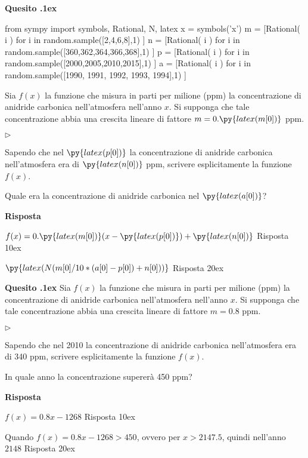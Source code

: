 \documentclass[11pt,twoside,a4paper]{article}
\newcommand{\mylabel}[1]{#1\hfill}
\renewenvironment{itemize}
  {\begin{list}{$\triangleright$}{%
   \setlength{\parskip}{0mm}
   \setlength{\topsep}{.4\baselineskip}
   \setlength{\rightmargin}{0mm}
   \setlength{\listparindent}{0mm}
   \setlength{\itemindent}{0mm}
   \setlength{\labelwidth}{2ex}
   \setlength{\itemsep}{.4\baselineskip}
   \setlength{\parsep}{0mm}
   \setlength{\partopsep}{0mm}
   \setlength{\labelsep}{1ex}
   \setlength{\leftmargin}{\labelwidth+\labelsep}
   \let\makelabel\mylabel}}{%
   \end{list}\vspace*{-1.3mm}}
\newcounter{quesito}
\newenvironment{question}{\bigskip\addtocounter{quesito}{1}\bigskip\bigskip\par\textbf{Quesito \thequesito.\kern1ex}}{\vspace{\parskip}}
\newenvironment{answer}{\par\textbf{Risposta\quad}}{\vspace{\parskip}}
\begin{document}
\begin{question}
\begin{pycode}
from sympy import symbols, Rational, N, latex
x = symbols('x')
m = [Rational( i ) for i in random.sample([2,4,6,8],1) ]
n = [Rational( i ) for i in random.sample([360,362,364,366,368],1) ]
p = [Rational( i ) for i in random.sample([2000,2005,2010,2015],1) ]
a = [Rational( i ) for i in random.sample([1990, 1991, 1992, 1993, 1994],1) ]
\end{pycode}
Sia $f(x)$ la funzione che misura in parti per milione (ppm) la concentrazione di anidride carbonica nell'atmosfera nell'anno $x$. Si supponga che tale concentrazione abbia una crescita lineare di fattore $m = 0.\py{latex(m[0])}$ ppm.
\begin{itemize}
\item[1.] Sapendo che nel $\py{latex(p[0])}$ la concentrazione di anidride carbonica nell'atmosfera era di $\py{latex(n[0])}$ ppm, scrivere esplicitamente la funzione $f(x)$.
\item[2.] Quale era la concentrazione di anidride carbonica nel $\py{latex(a[0])}$?
\end{itemize}
\begin{answer}

\smallskip
{\color{blue}
$f(x) = 0.\py{latex(m[0])} ( x - \py{latex(p[0])}) + \py{latex(n[0])}$
\hfill Risposta 1\kern0ex}

{\color{blue}
$\py{latex(N(m[0]/10*(a[0]-p[0])+n[0]))}$
\hfill Risposta 2\kern0ex}

\end{answer}
\end{question}
\begin{question}
Sia $f(x)$ la funzione che misura in parti per milione (ppm) la concentrazione di anidride carbonica nell'atmosfera nell'anno $x$. Si supponga che tale concentrazione abbia una crescita lineare di fattore $m = 0.8$ ppm.
\begin{itemize}
\item[1.] Sapendo che nel 2010 la concentrazione di anidride carbonica nell'atmosfera era di 340 ppm, scrivere esplicitamente la funzione $f(x)$.
\item[2.] In quale anno la concentrazione supererà 450 ppm?
\end{itemize}
\begin{answer}

\smallskip
{\color{blue}
$f(x) = 0.8 x - 1268$
\hfill Risposta 1\kern0ex}

Quando $f(x) = 0.8x - 1268 > 450$, ovvero per $x > 2147.5$, quindi nell'anno
{\color{blue}
$2148$
\hfill Risposta 2\kern0ex}

\end{answer}
\end{question}
\end{document}
